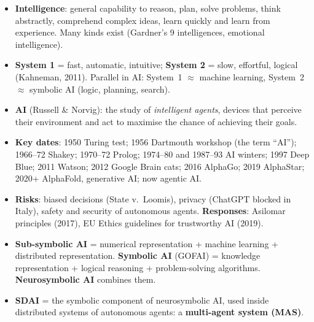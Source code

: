 \begin{nbsummary}[Introduction to AI]
\begin{itemize}[nosep]
  \item \textbf{Intelligence}: general capability to reason, plan, solve problems, think
        abstractly, comprehend complex ideas, learn quickly and learn from experience. Many
        kinds exist (Gardner's 9 intelligences, emotional intelligence).
  \item \textbf{System 1} = fast, automatic, intuitive; \textbf{System 2} = slow, effortful,
        logical (Kahneman, 2011). Parallel in AI: System~1 $\approx$ machine learning,
        System~2 $\approx$ symbolic AI (logic, planning, search).
  \item \textbf{AI} (Russell \& Norvig): the study of \emph{intelligent agents}, devices
        that perceive their environment and act to maximise the chance of achieving their goals.
  \item \textbf{Key dates}: 1950 Turing test; 1956 Dartmouth workshop (the term ``AI'');
        1966--72 Shakey; 1970--72 Prolog; 1974--80 and 1987--93 AI winters; 1997 Deep Blue;
        2011 Watson; 2012 Google Brain cats; 2016 AlphaGo; 2019 AlphaStar; 2020+ AlphaFold,
        generative AI; now agentic AI.
  \item \textbf{Risks}: biased decisions (State v.\ Loomis), privacy (ChatGPT blocked in
        Italy), safety and security of autonomous agents. \textbf{Responses}: Asilomar
        principles (2017), EU Ethics guidelines for trustworthy AI (2019).
  \item \textbf{Sub-symbolic AI} = numerical representation + machine learning + distributed
        representation. \textbf{Symbolic AI} (GOFAI) = knowledge representation + logical
        reasoning + problem-solving algorithms. \textbf{Neurosymbolic AI} combines them.
  \item \textbf{SDAI} = the symbolic component of neurosymbolic AI, used inside distributed
        systems of autonomous agents: a \textbf{multi-agent system (MAS)}.
\end{itemize}
\end{nbsummary}
